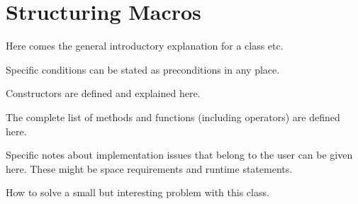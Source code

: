 \section{Structuring Macros}

 Here comes the general introductory explanation for a
class etc.

\precond Specific conditions can be stated as preconditions in any place.

\creation Constructors are defined and explained here.

\operations The complete list of methods and functions (including
operators) are defined here.

\implementation Specific notes about implementation issues that belong
to the user can be given here. These might be space requirements and
runtime statements.

\example How to solve a small but interesting problem with this class.


